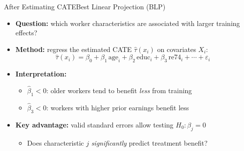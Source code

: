 \documentclass[dvipsnames,hyperref={pdfpagelabels=false}]{beamer}
\begin{document}
\begin{frame}{After Estimating CATE}{Best Linear Projection (BLP)}
\begin{itemize}
	\item \textbf{Question:} which worker characteristics are associated with larger training effects?
	\vspace{0.3cm}
	\item \textbf{Method:} regress the estimated CATE $\hat{\tau}(x_i)$ on covariates $X_i$:
	\[
		\hat{\tau}(x_i) = \beta_0 + \beta_1\,\text{age}_i + \beta_2\,\text{educ}_i + \beta_3\,\text{re74}_i + \cdots + \varepsilon_i
	\]
	\vspace{0.15cm}
	\item \textbf{Interpretation:}
	\vspace{0.1cm}
	\begin{itemize}
		\item $\hat{\beta}_1 < 0$: older workers tend to benefit \textit{less} from training
		\vspace{0.1cm}
		\item $\hat{\beta}_3 < 0$: workers with higher prior earnings benefit less
	\end{itemize}
	\vspace{0.3cm}
	\item \textbf{Key advantage:} valid standard errors allow testing $H_0: \beta_j = 0$
	\vspace{0.1cm}
	\begin{itemize}
		\item Does characteristic $j$ \textit{significantly} predict treatment benefit?
	\end{itemize}
\end{itemize}
\end{frame}
\end{document}
